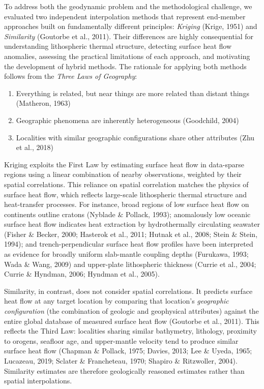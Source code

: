 \documentclass[draft,linenumbers]{agujournal2019}
\providecommand{\tightlist}{\setlength{\itemsep}{0pt}\setlength{\parskip}{0pt}}
\begin{document}
To address both the geodynamic problem and the methodological challenge,
we evaluated two independent interpolation methods that represent
end-member approaches built on fundamentally different principles:
\emph{Kriging} (Krige, 1951) and \emph{Similarity} (Goutorbe et al.,
2011). Their differences are highly consequential for understanding
lithospheric thermal structure, detecting surface heat flow anomalies,
assessing the practical limitations of each approach, and motivating the
development of hybrid methods. The rationale for applying both methods
follows from the \emph{Three Laws of Geography}:

\begin{enumerate}
\def\labelenumi{\arabic{enumi}.}
\tightlist
\item
  Everything is related, but near things are more related than distant
  things (Matheron, 1963)
\item
  Geographic phenomena are inherently heterogeneous (Goodchild, 2004)
\item
  Localities with similar geographic configurations share other
  attributes (Zhu et al., 2018)
\end{enumerate}

Kriging exploits the First Law by estimating surface heat flow in
data-sparse regions using a linear combination of nearby observations,
weighted by their spatial correlations. This reliance on spatial
correlation matches the physics of surface heat flow, which reflects
large-scale lithospheric thermal structure and heat-transfer processes.
For instance, broad regions of low surface heat flow on continents
outline cratons (Nyblade \& Pollack, 1993); anomalously low oceanic
surface heat flow indicates heat extraction by hydrothermally
circulating seawater (Fisher \& Becker, 2000; Hasterok et al., 2011;
Hutnak et al., 2008; Stein \& Stein, 1994); and trench-perpendicular
surface heat flow profiles have been interpreted as evidence for broadly
uniform slab-mantle coupling depths (Furukawa, 1993; Wada \& Wang, 2009)
and upper-plate lithospheric thickness (Currie et al., 2004; Currie \&
Hyndman, 2006; Hyndman et al., 2005).

Similarity, in contrast, does not consider spatial correlations. It
predicts surface heat flow at any target location by comparing that
location's \emph{geographic configuration} (the combination of geologic
and geophysical attributes) against the entire global database of
measured surface heat flow (Goutorbe et al., 2011). This reflects the
Third Law: localities sharing similar bathymetry, lithology, proximity
to orogens, seafloor age, and upper-mantle velocity tend to produce
similar surface heat flow (Chapman \& Pollack, 1975; Davies, 2013; Lee
\& Uyeda, 1965; Lucazeau, 2019; Sclater \& Francheteau, 1970; Shapiro \&
Ritzwoller, 2004). Similarity estimates are therefore geologically
reasoned estimates rather than spatial interpolations.
\end{document}
